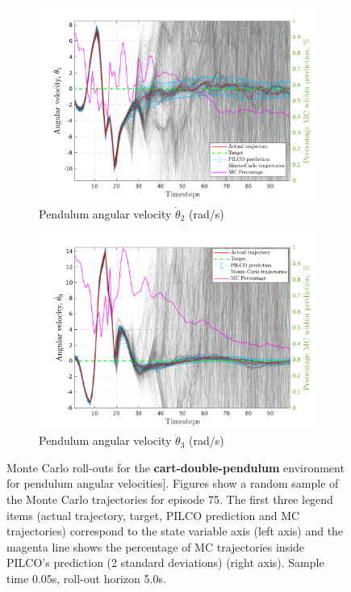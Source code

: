  
\begin{figure}[htbp]    
   \begin{subfigure}[b]{1\linewidth}
    \centering
    \includegraphics[height=0.4\textheight,width=1\textwidth]{Chapter3/Figures/cdp_MC_rollout_Ep_80_Dim_3.png} 
    \caption{Pendulum angular velocity $\dot{\theta}_2$ (rad/s)} 
    \label{Fig:Re-cdp-pen2-velocity} 
  \end{subfigure} 
  \hspace{\fill}
  \begin{subfigure}[b]{1\linewidth}
    \centering
    \includegraphics[height=0.4\textheight,width=1\textwidth]{Chapter3/Figures/cdp_MC_rollout_Ep_80_Dim_4.png} 
    \caption{Pendulum angular velocity $\dot{\theta}_3$ (rad/s)} 
    \label{Fig:Re-cdp-pen3-velocity} 
  \end{subfigure} 

\caption[Monte Carlo roll-outs for \textbf{cart-double-pendulum} pendulum angular velocities]{Monte Carlo roll-outs for the \textbf{cart-double-pendulum} environment for  pendulum angular velocities]. Figures show a random sample of the Monte Carlo trajectories for episode 75. The first three legend items (actual trajectory, target, PILCO prediction and MC trajectories) correspond to the state variable axis (left axis) and the magenta line shows the percentage of MC trajectories inside PILCO's prediction (2 standard deviations) (right axis). Sample time 0.05s, roll-out horizon 5.0s.}
\label{Fig:Re-cdp-MC-roll-outs-2} 
\end{figure}
 
